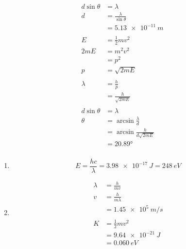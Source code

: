 \documentclass{article}
\begin{document}
\setcounter{subsubsection}{76}
\subsubsection{}

\begin{align*}
  d \sin \theta & = \lambda                          \\
  d             & = \frac{\lambda}{\sin \theta}      \\
                & = \qty{5.13e-11}{m}                \\ \\
  E             & = \frac{1}{2} m v^2                \\
  2 m E         & = m^2 v^2                          \\
                & = p^2                              \\
  p             & = \sqrt{2 m E}                     \\ \\
  \lambda       & = \frac{h}{p}                      \\
                & = \frac{h}{\sqrt{2 m E}}           \\ \\
  d \sin \theta & = \lambda                          \\
  \theta        & = \arcsin \frac{\lambda}{d}        \\
                & = \arcsin \frac{h}{d \sqrt{2 m E}} \\
                & = \ang{20.89}
\end{align*}

\setcounter{subsubsection}{78}
\subsubsection{}

\begin{enumerate}
  \item \[E = \frac{h c}{\lambda} = \qty{3.98e-17}{J} = \qty{248}{eV}\]

  \item

        \begin{align*}
          \lambda & = \frac{h}{m v}       \\
          v       & = \frac{h}{m \lambda} \\
                  & = \qty{1.45e5}{m/s}   \\ \\
          K       & = \frac{1}{2} m v^2   \\
                  & = \qty{9.64e-21}{J}   \\
                  & = \qty{0.060}{eV}
        \end{align*}
\end{enumerate}
\end{document}

